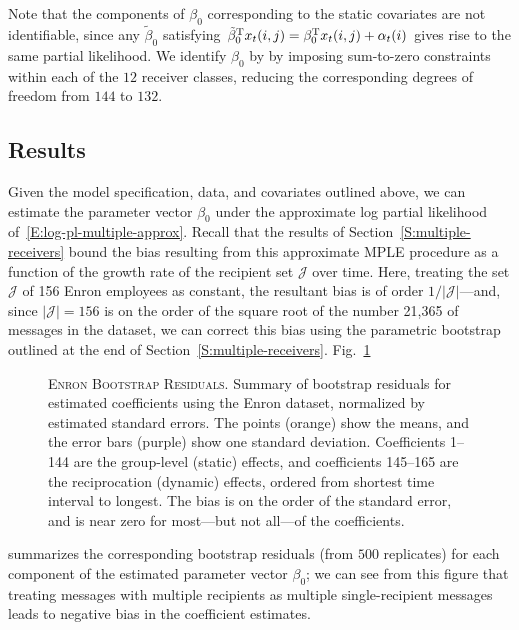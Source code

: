 \documentclass[final]{statsoc}
\begin{document}
Note that the components of $\beta_0$ corresponding to the static
covariates are not identifiable, since any $\tilde \beta_0$ satisfying
$\tilde \beta_0^{\mathrm{T}} x_t(i,j) = \beta_0^{\mathrm{T}} x_t(i,j) + \alpha_t(i)$
gives rise to the same partial likelihood.  We identify $\beta_0$ by by
imposing sum-to-zero constraints within each of the $12$ receiver
classes, reducing the corresponding degrees of freedom from $144$ to $132$.

\subsection{Results}

Given the model specification, data, and covariates outlined above, we can
estimate the parameter vector $\beta_0$ under the approximate
log partial likelihood of~\eqref{E:log-pl-multiple-approx}.  Recall
that the results of Section~\ref{S:multiple-receivers} bound the bias
resulting from this approximate MPLE procedure as a function of the growth
rate of the recipient set $\mathcal{J}$ over time.  Here, treating the
set $\mathcal{J}$ of 156 Enron employees as constant, the resultant bias
is of order $1/|\mathcal{J}|$---and, since $|\mathcal{J}| = 156$ is on the
order of the square root of the number 21,365 of messages in the dataset,
we can correct this bias using the parametric bootstrap outlined at the
end of Section~\ref{S:multiple-receivers}.  Fig.~\ref{F:boot-resid}
\begin{figure}[t]
    \centering
    \caption{
        \textsc{Enron Bootstrap Residuals.} Summary of bootstrap residuals
        for estimated coefficients using the Enron dataset, normalized by
        estimated standard errors.  The points (orange) show the means, and
        the error bars (purple) show one standard deviation.  Coefficients
        1--144 are the group-level (static) effects, and coefficients
        145--165 are the reciprocation (dynamic) effects, ordered from
        shortest time interval to longest.  The bias is on the order of
        the standard error, and is near zero for most---but not all---of the
        coefficients.
    }
    \label{F:boot-resid}
\end{figure}
summarizes the corresponding bootstrap residuals (from $500$ replicates) for
each component of the estimated parameter vector $\beta_0$; we can see from
this figure that treating messages with multiple recipients as multiple
single-recipient messages leads to negative bias in the coefficient
estimates.
\end{document}
